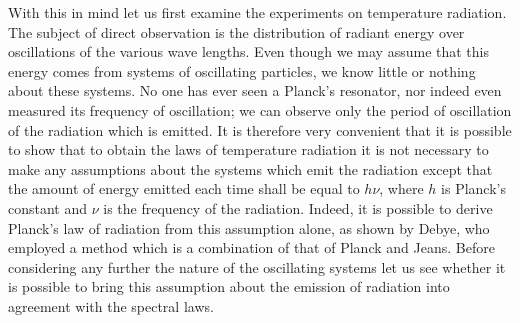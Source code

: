 With this in mind let us first examine the experiments on temperature
radiation. The subject of direct observation is the distribution of
radiant energy over oscillations of the various wave lengths. Even
though we may assume that this energy comes from systems of oscillating
particles, we know little or nothing about these systems. No one has
ever seen a Planck's resonator, nor indeed even measured its frequency
of oscillation; we can observe only the period of oscillation of the
radiation which is emitted. It is therefore very convenient that it is
possible to show that to obtain the laws of temperature radiation it is
not necessary to make any assumptions about the systems which emit the
radiation except that the amount of energy emitted each time shall be
equal to $h\nu$, where $h$ is Planck's constant and $\nu$ is
the frequency of the radiation. Indeed, it is possible to derive
Planck's law of radiation from this assumption alone, as shown by Debye,
who employed a method which is a combination of that of Planck and
Jeans. Before considering any further the nature of the oscillating
systems let us see whether it is possible to bring this assumption about
the emission of radiation into agreement with the spectral laws.

